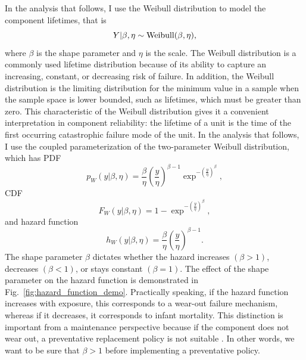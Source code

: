 In the analysis that follows, I use the Weibull distribution to model the component lifetimes, that is
\begin{equation}
    Y|\beta, \eta \sim \hbox{Weibull}(\beta, \eta),
\end{equation}
where $\beta$ is the shape parameter and $\eta$ is the scale. The Weibull distribution is a commonly used lifetime distribution because of its ability to capture an increasing, constant, or decreasing risk of failure. In addition, the Weibull distribution is the limiting distribution for the minimum value in a sample when the sample space is lower bounded, such as lifetimes, which must be greater than zero. This characteristic of the Weibull distribution gives it a convenient interpretation in component reliability: the lifetime of a unit is the time of the first occurring catastrophic failure mode of the unit. In the analysis that follows, I use the coupled parameterization of the two-parameter Weibull distribution, which has PDF
\begin{equation}
    \label{eq:weibull-pdf}
    p_{W}(y|\beta, \eta) = \frac{\beta}{\eta}\left(\frac{y}{\eta}\right)^{\beta - 1} \exp^{-\left(\frac{y}{\eta}\right)^{\beta}},
\end{equation}
CDF
\begin{equation}
    \label{eq:weibull-cdf}
    F_{W}(y|\beta, \eta) = 1 - \exp^{-\left(\frac{y}{\eta}\right)^{\beta}},
\end{equation}
and hazard function
\begin{equation}
    h_{W}(y|\beta, \eta) = \frac{\beta}{\eta}\left(\frac{y}{\eta}\right)^{\beta - 1}.
\end{equation}
The shape parameter $\beta$ dictates whether the hazard increases $(\beta > 1)$, decreases $(\beta < 1)$, or stays constant $(\beta = 1)$. The effect of the shape parameter on the hazard function is demonstrated in Fig.~\ref{fig:hazard_function_demo}. Practically speaking, if the hazard function increases with exposure, this corresponds to a wear-out failure mechanism, whereas if it decreases, it corresponds to infant mortality. This distinction is important from a maintenance perspective because if the component does not wear out, a preventative replacement policy is not suitable \citep{jardine2013}. In other words, we want to be sure that $\beta > 1$ before implementing a preventative policy.

